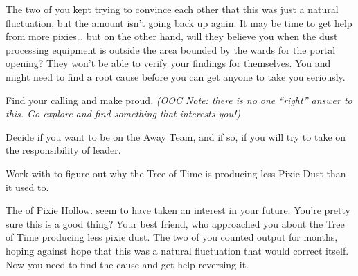\documentclass[char]{PP}
\begin{document}
The two of you kept trying to convince each other that this was just a natural fluctuation, but the amount isn’t going back up again. It may be time to get help from more pixies… but on the other hand, will they believe you when the dust processing equipment is outside the area bounded by the wards for the portal opening? They won’t be able to verify your findings for themselves. You and \cMTree{} might need to find a root cause before you can get anyone to take you seriously.
 

\begin{itemz}
	\item Find your calling and make \cSHead{} proud. \textit{(OOC Note: there is no one ``right'' answer to this. Go explore and find something that interests you!)}
	\item Decide if you want to be on the Away Team, and if so, if you will try to take on the responsibility of leader.
	\item Work with \cMTree{} to figure out why the Tree of Time is producing less Pixie Dust than it used to.
\end{itemz}

\begin{itemz}[Notes]
	\item 
\end{itemz}

\begin{contacts}
	\contact{\cSHead{}} The \cSHead{\Majesty} of Pixie Hollow. \cSHead{\They} seem\cSHead{\plural} to have taken an interest in your future. You’re pretty sure this is a good thing?
	\contact{\cMTree{}} Your best friend, who approached you about the Tree of Time producing less pixie dust. The two of you counted output for months, hoping against hope that this was a natural fluctuation that would correct itself. Now you need to find the cause and get help reversing it.
\end{contacts}
\end{document}
